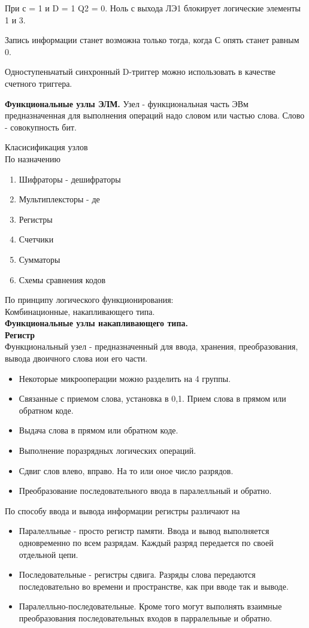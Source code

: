 При с = 1 и D = 1
Q2 = 0. Ноль с выхода ЛЭ1 блокирует логические элементы 1 и 3.

Запись информации станет возможна только тогда, когда С опять станет равным 0.

Одноступеньчатый синхронный D-триггер можно использовать в качестве счетного триггера.


\textbf{Функциональные узлы ЭЛМ. }
Узел - функциональная часть ЭВм предназначенная для выполнения операций надо словом или частью слова.
Слово - совокупность бит.

Класисификация узлов \\
По назначению
\begin{enumerate}
  \item Шифраторы - дешифраторы
  \item Мультиплексторы - де
  \item Регистры
  \item Счетчики
  \item Сумматоры
  \item Схемы сравнения кодов
\end{enumerate}
По принципу логического функционирования:\\
Комбинационные, накапливающего типа.\\

\textbf{Функциональные узлы накапливающего типа.}\\
\textbf{Регистр}\\
Функциональный узел - предназначенный для ввода, хранения, преобразования, вывода двоичного слова иои его части.\\
\begin{itemize}
\item Некоторые микрооперации можно разделить на 4 группы. \\
\item Связанные с приемом слова, установка в 0,1. Прием слова в прямом или обратном коде.\\
\item Выдача слова в прямом или обратном коде.\\
\item Выполнение поразрядных логических операций.\\
\item Сдвиг слов влево, вправо. На то или оное число разрядов.
\item Преобразование последовательного ввода в паралелльный и обратно.


\end{itemize}
По способу ввода и вывода информации регистры различают на \\
\begin{itemize}
\item Паралелльные - просто регистр памяти.
Ввода и вывод выполняется одновременно по всем разрядам. Каждый разряд передается по своей отдельной цепи.
\item Последовательные - регистры сдвига.
Разряды слова передаются последовательно во времени и пространстве, как при вводе так и выводе.
\item Паралелльно-последовательные. Кроме того могут выполнять взаимные преобразования последовательных входов в парралельные и обратно.
\end{itemize}

